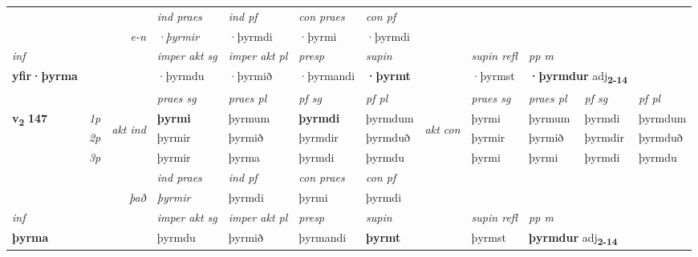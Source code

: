 \begin{longtable}[l]{X>{\footnotesize\itshape}llXXXXlXXXX}
   && &  \textit{ind praes} & \textit{ind pf} & \textit{con praes} & \textit{con pf} \\*
\multicolumn{3}{r}{\textit{e-n}} & ·þyrmir & ·þyrmdi & ·þyrmi & ·þyrmdi \\*

\cmidrule{4-7}
   {\textit{inf}} & &  & \textit{imper akt sg} & \textit{imper akt pl}   & \textit{presp} & \textit{supin} && \textit{supin refl} & \textit{pp m} \\*
  {\textbf{yfir\allowbreak ·þyrma}} & && ·þyrmdu  & ·þyrmið   & ·þyrmandi &  \textbf{·þyrmt} && ·þyrmst & \multicolumn{2}{l}{\textbf{·þyrmdur} adj\textbf{\textsubscript{2-14}}} \\*

\midrule

 & &   & \textit{praes sg}  & \textit{praes pl}    & \textit{ pf sg} & \textit{pf pl} & & \textit{praes sg}  & \textit{praes pl}    & \textit{pf sg} & \textit{pf pl }  \\ \cmidrule{4-7} \cmidrule{9-12}
 \multirow{2}{*}{{{\textbf{v{\textsubscript{2}}} \Large{\textbf{147}}}}}  & 1p & \multirow{3}{*}{\begin{turn}{90}\textit{akt ind}\end{turn}} & \textbf{þyrmi} & þyrmum & \textbf{þyrmdi} & þyrmdum & \multirow{3}{*}{\begin{turn}{90}\textit{akt con}\end{turn}} &þyrmi & þyrmum & þyrmdi & þyrmdum\\*
 & 2p &  &  þyrmir  & þyrmið & þyrmdir & þyrmduð & & þyrmir & þyrmið & þyrmdir & þyrmduð \\*
 & 3p &  & þyrmir & þyrma & þyrmdi & þyrmdu & & þyrmi & þyrmi& þyrmdi & þyrmdu \\*
\cmidrule{4-7} \cmidrule{9-12}

   && &  \textit{ind praes} & \textit{ind pf} & \textit{con praes} & \textit{con pf} \\*
\multicolumn{3}{r}{\textit{það}} & þyrmir & þyrmdi & þyrmi & þyrmdi \\*

\cmidrule{4-7}
   {\textit{inf}} & &  & \textit{imper akt sg} & \textit{imper akt pl}   & \textit{presp} & \textit{supin} && \textit{supin refl} & \textit{pp m} \\*
  {\textbf{þyrma}} & && þyrmdu  & þyrmið   & þyrmandi &  \textbf{þyrmt} && þyrmst & \multicolumn{2}{l}{\textbf{þyrmdur} adj\textbf{\textsubscript{2-14}}} \\*

\midrule


\end{longtable}
